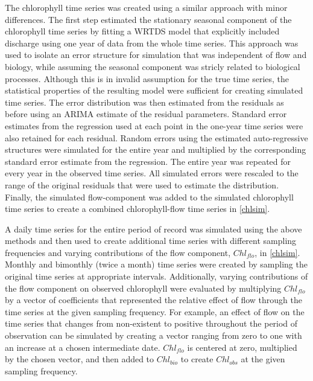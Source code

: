 \documentclass[letterpaper,12pt,oneside]{article}\usepackage[]{graphicx}\usepackage[]{color}
\begin{document}
The chlorophyll time series was created using a similar approach with minor differences.  The first step estimated the stationary seasonal component of the chlorophyll time series by fitting a \ac{WRTDS} model that explicitly included discharge using one year of data from the whole time series.  This approach was used to isolate an error structure for simulation that was independent of flow and biology, while assuming the seasonal component was stricly related to biological processes.  Although this is in invalid assumption for the true time series, the statistical properties of the resulting model were sufficient for creating simulated time series.  The error distribution was then estimated from the residuals as before using an \ac{ARIMA} estimate of the residual parameters.  Standard error estimates from the regression used at each point in the one-year time series were also retained for each residual.  Random errors using the estimated auto-regressive structures were simulated for the entire year and multiplied by the corresponding standard error estimate from the regression.  The entire year was repeated for every year in the observed time series.  All simulated errors were rescaled to the range of the original residuals that were used to estimate the distribution.  Finally, the simulated flow-component was added to the simulated chlorophyll time series to create a combined chlorophyll-flow time series in \cref{chlsim}.  

A daily time series for the entire period of record was simulated using the above methods and then used to create additional time series with different sampling frequencies and varying contributions of the flow component, $Chl_{flo}$, in \cref{chlsim}.  Monthly and bimonthly (twice a month) time series were created by sampling the original time series at appropriate intervals.  Additionally, varying contributions of the flow component on observed chlorophyll were evaluated by multiplying $Chl_{flo}$ by a vector of coefficients that represented the relative effect of flow through the time series at the given sampling frequency.  For example, an effect of flow on the time series that changes from non-existent to positive throughout the period of observation can be simulated by creating a vector ranging from zero to one with an increase at a chosen intermediate date.  $Chl_{flo}$ is centered at zero, multiplied by the chosen vector, and then added to $Chl_{bio}$ to create $Chl_{obs}$ at the given sampling frequency.
\end{document}
